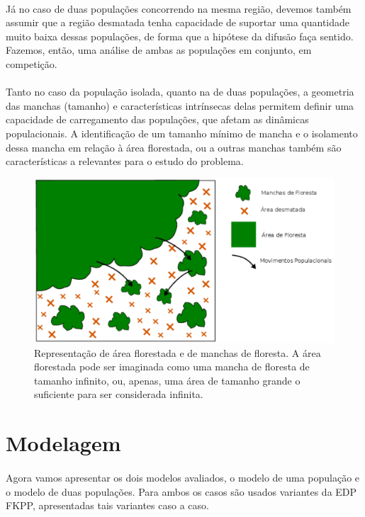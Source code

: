 \documentclass{article}
\begin{document}
	\paragraph{}
	Já no caso de duas populações concorrendo na mesma região, devemos também assumir que a região desmatada tenha capacidade de suportar uma quantidade muito baixa dessas populações, de forma que a hipótese da difusão faça sentido. Fazemos, então, uma análise de ambas as populações em conjunto, em competição.
	
	\paragraph{}
	Tanto no caso da população isolada, quanto na de duas populações, a geometria das manchas (tamanho) e características intrínsecas delas permitem definir uma capacidade de carregamento das populações, que afetam as dinâmicas populacionais. A identificação de um tamanho mínimo de mancha e o isolamento dessa mancha em relação à área florestada, ou a outras manchas também são características a relevantes para o estudo do problema.
	
	\begin{figure}[h]
		\centering
		\includegraphics[scale=0.3]{Esquema-Floresta}
		\caption{Representação de área florestada e de manchas de floresta. A área florestada pode ser imaginada como uma mancha de floresta de tamanho infinito, ou, apenas, uma área de tamanho grande o suficiente para ser considerada infinita.}
		\label{fig:efloresta}
	\end{figure}
	
	\section{Modelagem}
	
	\paragraph{}
	Agora vamos apresentar os dois modelos avaliados, o modelo de uma população e o modelo de duas populações. Para ambos os casos são usados variantes da EDP FKPP, apresentadas tais variantes caso a caso.
	
\end{document}
